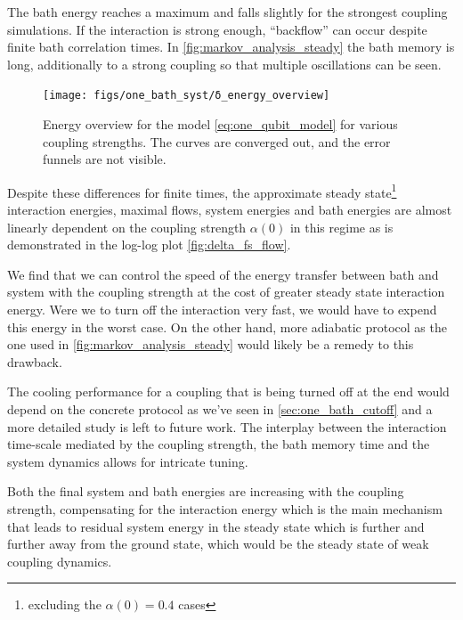 The bath energy reaches a maximum and falls slightly for the strongest
coupling simulations. If the interaction is strong enough,
``backflow'' can occur despite finite bath correlation times. In
\cref{fig:markov_analysis_steady} the bath memory is long,
additionally to a strong coupling so that multiple oscillations can be
seen.
\begin{figure}[htp]
  \centering
  \texttt{[image: figs/one\_bath\_syst/δ\_energy\_overview]}
  \caption{\label{fig:delta_energy_overview} Energy overview for the
    model \cref{eq:one_qubit_model} for various coupling
    strengths. The curves are converged out, and the error funnels are
    not visible.}
\end{figure}

Despite these differences for finite times, the approximate steady
state\footnote{excluding the \(α(0)=0.4\) cases} interaction energies,
maximal flows, system energies and bath energies are almost linearly
dependent on the coupling strength \(α(0)\) in this regime as is
demonstrated in the log-log plot \cref{fig:delta_fs_flow}.

We find that we can control the speed of the energy transfer between
bath and system with the coupling strength at the cost of greater
steady state interaction energy. Were we to turn off the interaction
very fast, we would have to expend this energy in the worst case. On
the other hand, more adiabatic protocol as the one used in
\cref{fig:markov_analysis_steady} would likely be a remedy to this
drawback.

The cooling performance for a coupling that is being turned off at the
end would depend on the concrete protocol as we've seen in
\cref{sec:one_bath_cutoff} and a more detailed study is left to future
work. The interplay between the interaction time-scale mediated by the
coupling strength, the bath memory time and the system dynamics allows
for intricate tuning.

Both the final system and bath energies are increasing with the
coupling strength, compensating for the interaction energy which is
the main mechanism that leads to residual system energy in the steady
state which is further and further away from the ground state, which
would be the steady state of weak coupling dynamics.


